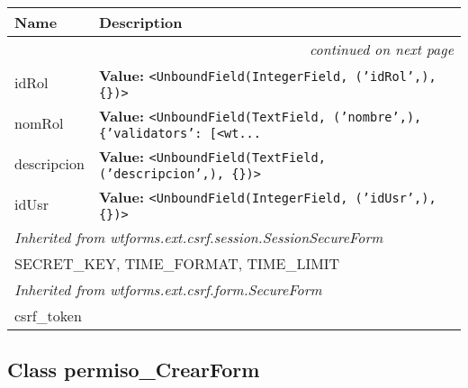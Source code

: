     \vspace{-1cm}
\hspace{\varindent}\begin{longtable}{|p{\varnamewidth}|p{\vardescrwidth}|l}
\cline{1-2}
\cline{1-2} \centering \textbf{Name} & \centering \textbf{Description}& \\
\cline{1-2}
\endhead\cline{1-2}\multicolumn{3}{r}{\small\textit{continued on next page}}\\\endfoot\cline{1-2}
\endlastfoot\raggedright i\-d\-R\-o\-l\- & \raggedright \textbf{Value:} 
{\tt {\textless}UnboundField(IntegerField, ('idRol',), \{\}){\textgreater}}&\\
\cline{1-2}
\raggedright n\-o\-m\-R\-o\-l\- & \raggedright \textbf{Value:} 
{\tt {\textless}UnboundField(TextField, ('nombre',), \{'validators': [{\textless}wt\texttt{...}}&\\
\cline{1-2}
\raggedright d\-e\-s\-c\-r\-i\-p\-c\-i\-o\-n\- & \raggedright \textbf{Value:} 
{\tt {\textless}UnboundField(TextField, ('descripcion',), \{\}){\textgreater}}&\\
\cline{1-2}
\raggedright i\-d\-U\-s\-r\- & \raggedright \textbf{Value:} 
{\tt {\textless}UnboundField(IntegerField, ('idUsr',), \{\}){\textgreater}}&\\
\cline{1-2}
\multicolumn{2}{|l|}{\textit{Inherited from wtforms.ext.csrf.session.SessionSecureForm}}\\
\multicolumn{2}{|p{\varwidth}|}{\raggedright SECRET\_KEY, TIME\_FORMAT, TIME\_LIMIT}\\
\cline{1-2}
\multicolumn{2}{|l|}{\textit{Inherited from wtforms.ext.csrf.form.SecureForm}}\\
\multicolumn{2}{|p{\varwidth}|}{\raggedright csrf\_token}\\
\cline{1-2}
\end{longtable}



\subsection{Class permiso\_CrearForm}

